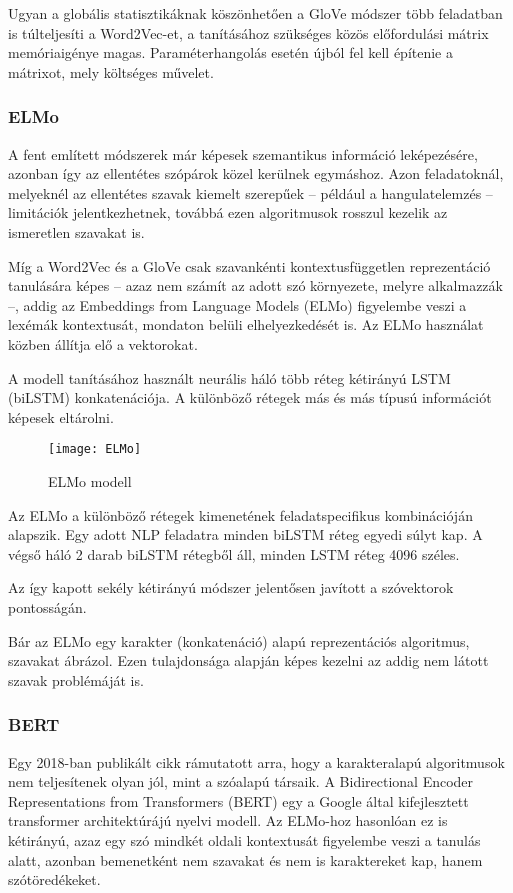 Ugyan a globális statisztikáknak köszönhetően a GloVe módszer több feladatban is túlteljesíti a Word2Vec-et, a tanításához szükséges közös előfordulási mátrix memóriaigénye magas. Paraméterhangolás esetén újból fel kell építenie a mátrixot, mely költséges művelet.

\subsubsection{ELMo}
A fent említett módszerek már képesek szemantikus információ leképezésére, azonban így az ellentétes szópárok közel kerülnek egymáshoz. Azon feladatoknál, melyeknél az ellentétes szavak kiemelt szerepűek – például a hangulatelemzés – limitációk jelentkezhetnek, továbbá ezen algoritmusok rosszul kezelik az ismeretlen szavakat is.

Míg a Word2Vec és a GloVe csak szavankénti kontextusfüggetlen reprezentáció tanulására képes – azaz nem számít az adott szó környezete, melyre alkalmazzák –, addig az Embeddings from Language Models (ELMo) figyelembe veszi a lexémák kontextusát, mondaton belüli elhelyezkedését is. Az ELMo használat közben állítja elő a vektorokat.

A modell tanításához használt neurális háló több réteg kétirányú LSTM (biLSTM) konkatenációja. A különböző rétegek más és más típusú információt képesek eltárolni.

\begin{figure}[H]
	\centering
	\texttt{[image: ELMo]}
	\caption{ELMo modell}
\end{figure}

Az ELMo a különböző rétegek kimenetének feladatspecifikus kombinációján alapszik. Egy adott NLP feladatra minden biLSTM réteg egyedi súlyt kap. A végső háló 2 darab biLSTM rétegből áll, minden LSTM réteg 4096 széles.

Az így kapott sekély kétirányú módszer jelentősen javított a szóvektorok pontosságán.

Bár az ELMo egy karakter (konkatenáció) alapú reprezentációs algoritmus, szavakat ábrázol. Ezen tulajdonsága alapján képes kezelni az addig nem látott szavak problémáját is.


\subsubsection{BERT}
Egy 2018-ban publikált cikk rámutatott arra, hogy a karakteralapú algoritmusok nem teljesítenek olyan jól, mint a szóalapú társaik. A Bidirectional Encoder Representations from Transformers (BERT) egy a Google által kifejlesztett transformer architektúrájú nyelvi modell. Az ELMo-hoz hasonlóan ez is kétirányú, azaz egy szó mindkét oldali kontextusát figyelembe veszi a tanulás alatt, azonban bemenetként nem szavakat és nem is karaktereket kap, hanem szótöredékeket.

